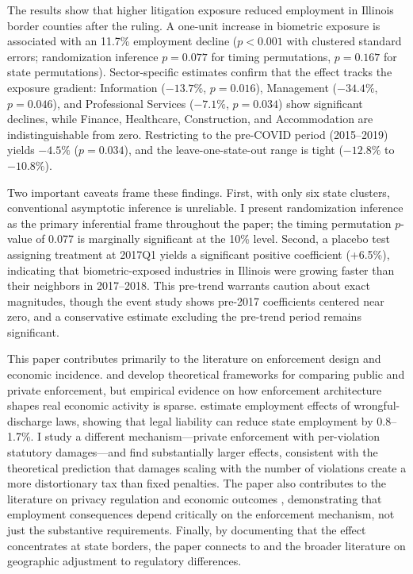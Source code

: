 \documentclass[12pt]{article}
\begin{document}
The results show that higher litigation exposure reduced employment in Illinois border counties after the ruling. A one-unit increase in biometric exposure is associated with an 11.7\% employment decline ($p < 0.001$ with clustered standard errors; randomization inference $p = 0.077$ for timing permutations, $p = 0.167$ for state permutations). Sector-specific estimates confirm that the effect tracks the exposure gradient: Information ($-13.7\%$, $p = 0.016$), Management ($-34.4\%$, $p = 0.046$), and Professional Services ($-7.1\%$, $p = 0.034$) show significant declines, while Finance, Healthcare, Construction, and Accommodation are indistinguishable from zero. Restricting to the pre-COVID period (2015--2019) yields $-4.5\%$ ($p = 0.034$), and the leave-one-state-out range is tight ($-12.8\%$ to $-10.8\%$).

Two important caveats frame these findings. First, with only six state clusters, conventional asymptotic inference is unreliable. I present randomization inference as the primary inferential frame throughout the paper; the timing permutation $p$-value of 0.077 is marginally significant at the 10\% level. Second, a placebo test assigning treatment at 2017Q1 yields a significant positive coefficient (+6.5\%), indicating that biometric-exposed industries in Illinois were growing faster than their neighbors in 2017--2018. This pre-trend warrants caution about exact magnitudes, though the event study shows pre-2017 coefficients centered near zero, and a conservative estimate excluding the pre-trend period remains significant.

This paper contributes primarily to the literature on enforcement design and economic incidence. \citet{shavell1984} and \citet{polinskys2000} develop theoretical frameworks for comparing public and private enforcement, but empirical evidence on how enforcement architecture shapes real economic activity is sparse. \citet{autordsh2006} estimate employment effects of wrongful-discharge laws, showing that legal liability can reduce state employment by 0.8--1.7\%. I study a different mechanism---private enforcement with per-violation statutory damages---and find substantially larger effects, consistent with the theoretical prediction that damages scaling with the number of violations create a more distortionary tax than fixed penalties. The paper also contributes to the literature on privacy regulation and economic outcomes \citep{millertuck2009, acquisti2016, johnson2021}, demonstrating that employment consequences depend critically on the enforcement mechanism, not just the substantive requirements. Finally, by documenting that the effect concentrates at state borders, the paper connects to \citet{holmes1998} and the broader literature on geographic adjustment to regulatory differences.
\end{document}
